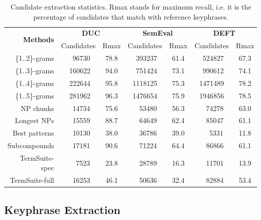     \begin{table}[h]
      \centering
      \begin{tabular}{rcccccc}
        \toprule
        \multirow{2}{*}[-2pt]{\textbf{Methods}} & \multicolumn{2}{c}{\textbf{DUC}} & \multicolumn{2}{c}{\textbf{SemEval}} & \multicolumn{2}{c}{\textbf{DEFT}}\\
        \cmidrule(r){2-3}\cmidrule(lr){4-5}\cmidrule(l){6-7}
        & Candidates & Rmax & Candidates & Rmax & Candidates & Rmax\\
        \midrule
        \{1..2\}-grams & $~~~~$96730 & 78.8 & $~~$393237 & 61.4 & $~~$524827 & 67.3\\
        \{1..3\}-grams & $~~$160622 & 94.0 & $~~$751424 & 73.1 & $~~$990612 & 74.1\\
        \{1..4\}-grams & $~~$222644 & 95.8 & 1118125 & 75.3 & 1471489 & 78.2\\
        \{1..5\}-grams & $~~$281962 & 96.3 & 1476654 & 75.9 & 1946856 & 78.5\\
        NP chunks & $~~~~$14734 & 75.6 & $~~~~$53480 & 56.3 & $~~~~$74278 & 63.0\\
        Longest NPs & $~~~~$15559 & 88.7 & $~~~~$64649 & 62.4 & $~~~~$85047 & 61.1\\
        Best patterns & $~~~~$10130 & 38.0 & $~~~~$36786 & 39.0 & $~~~~~~$5331 & 11.8\\
        Subcompounds & $~~~~$17181 & 90.6 & $~~~~$71224 & 64.4 & $~~~~$86866 & 61.1 \\
        TermSuite-spec & $~~~~~~$7523 & 23.8 & $~~~~$28789 & 16.3 & $~~~~$11701 & 13.9\\
        TermSuite-full & $~~~~$16253 & 46.1 & $~~~~$50636 & 32.4 & $~~~~$82884 & 53.4\\
        \bottomrule
      \end{tabular}
      \caption{Candidate extraction statistics. Rmax stands for maximum recall,
               i.e. it is the percentage of candidates that match with reference
               keyphrases. \label{tab:candidate_extraction_statistics}}
    \end{table}


  \subsection{Keyphrase Extraction}
  \label{subsec:keyphrase_extraction}

